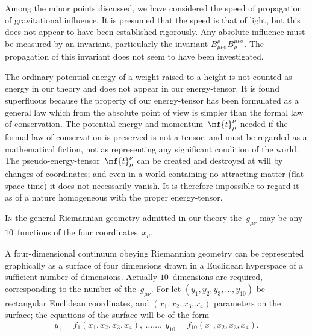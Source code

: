 \documentclass[12pt]{book}
\begin{document}
Among the minor points discussed, we have considered the speed of propagation
of gravitational influence. It is presumed that the speed is that
of light, but this does not appear to have been established rigorously. Any
absolute influence must be measured by an invariant, particularly the invariant
$B_{\mu\nu\sigma}^{\rho} B_{\rho}^{\mu\nu\sigma}$. The propagation of this invariant does not seem to have
been investigated.

The ordinary potential energy of a weight raised to a height is not counted
%
as energy in our theory and does not appear in our energy\hyp{}tensor. It is found
superfluous because the property of our energy\hyp{}tensor has been formulated
as a general law which from the absolute point of view is simpler than the
formal law of conservation. The potential energy and momentum~$\mf{t}_{\mu}^{\nu}$ needed
if the formal law of conservation is preserved is not a tensor, and must be
regarded as a mathematical fiction, not as representing any significant condition
of the world. The pseudo\hyp{}energy\hyp{}tensor~$\mf{t}_{\mu}^{\nu}$ can be created and destroyed
at will by changes of coordinates; and even in a world containing no attracting
matter (flat space-time) it does not necessarily vanish. It is therefore impossible
to regard it as of a nature homogeneous with the proper energy\hyp{}tensor.

%


\lettrine{\textcolor{lettrinecolour}{I}}{n} the general Riemannian geometry admitted in our theory the~$g_{\mu\nu}$ may
be any $10$~functions of the four coordinates~$x_{\mu}$.

A four\hyp{}dimensional continuum obeying Riemannian geometry can be
represented graphically as a surface of four dimensions drawn in a Euclidean
hyperspace of a sufficient number of dimensions. Actually $10$~dimensions are
required, corresponding to the number of the~$g_{\mu\nu}$. For let $(y_{1}, y_{2}, y_{3}, \dots, y_{10})$ be
rectangular Euclidean coordinates, and $(x_{1}, x_{2}, x_{3}, x_{4})$ parameters on the surface;
the equations of the surface will be of the form
\[
y_{1} = f_{1}(x_{1}, x_{2}, x_{3}, x_{4}),\ \dots\dots,\
y_{10} = f_{10}(x_{1}, x_{2}, x_{3}, x_{4}).
\]
\end{document}
